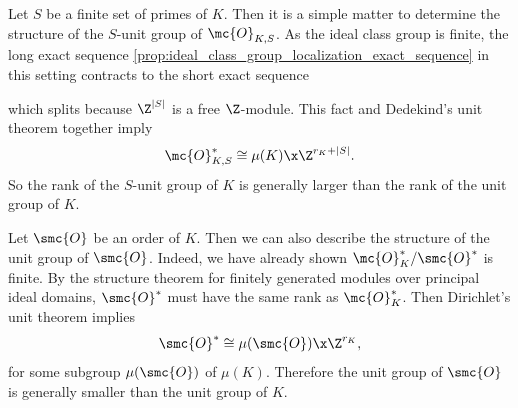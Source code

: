 \documentclass[12pt]{article}
\begin{document}
      Let \(S\) be a finite set of primes of \(K\). Then it is a simple matter to determine the structure of the \(S\)-unit group of \(\mc{O}_{K,S}\). As the ideal class group is finite, the long exact sequence \cref{prop:ideal_class_group_localization_exact_sequence} in this setting contracts to the short exact sequence
      \begin{center}
      \end{center}
      which splits because \(\Z^{|S|}\) is a free \(\Z\)-module. This fact and Dedekind's unit theorem together imply
      \[
        \mc{O}_{K,S}^{\ast} \cong \mu(K) \x \Z^{r_{K}+|S|}.
      \]
      So the rank of the \(S\)-unit group of \(K\) is generally larger than the rank of the unit group of \(K\).

      Let \(\smc{O}\) be an order of \(K\). Then we can also describe the structure of the unit group of \(\smc{O}\). Indeed, we have already shown \(\mc{O}_{K}^{\ast}/\smc{O}^{\ast}\) is finite. By the structure theorem for finitely generated modules over principal ideal domains, \(\smc{O}^{\ast}\) must have the same rank as \(\mc{O}_{K}^{\ast}\). Then Dirichlet's unit theorem implies
      \[
        \smc{O}^{\ast} \cong \mu(\smc{O}) \x \Z^{r_{K}},
      \]
      for some subgroup \(\mu(\smc{O})\) of \(\mu(K)\). Therefore the unit group of \(\smc{O}\) is generally smaller than the unit group of \(K\).
\end{document}
